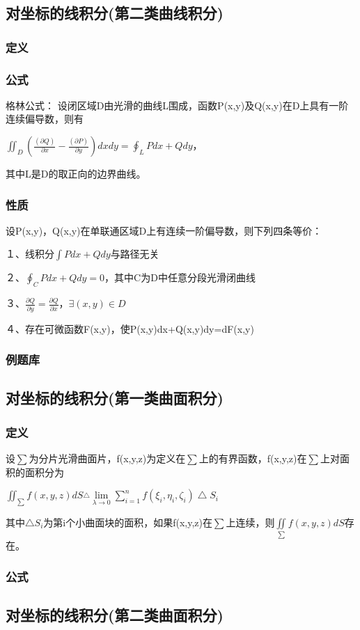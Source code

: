 \documentclass{ctexart}
\begin{document}
\subsection{对坐标的线积分(第二类曲线积分)}
\subsubsection{定义} 
\subsubsection{公式}

格林公式：
设闭区域D由光滑的曲线L围成，函数P(x,y)及Q(x,y)在D上具有一阶连续偏导数，则有
\begin{center}
$\iint_{D} (\frac{(\partial Q)}{\partial x}-\frac{(\partial P)}{\partial y})dxdy=\oint_L Pdx+Qdy$，
\end{center}
其中L是D的取正向的边界曲线。
\subsubsection{性质}

设P(x,y)，Q(x,y)在单联通区域D上有连续一阶偏导数，则下列四条等价：

１、线积分$\int　Pdx+Qdy$与路径无关

２、$\oint_C Pdx+Qdy=0$，其中C为D中任意分段光滑闭曲线

３、$\frac{\partial Q}{\partial y}=\frac{\partial Q}{\partial x}$，$\exists (x,y) \in D$

４、存在可微函数F(x,y)，使P(x,y)dx+Q(x,y)dy=dF(x,y)

\subsubsection{例题库}

\subsection{对坐标的线积分(第一类曲面积分)}
\subsubsection{定义}
设$\sum$为分片光滑曲面片，f(x,y,z)为定义在$\sum$上的有界函数，f(x,y,z)在$\sum$上对面积的面积分为
\begin{center}
 $\iint_{\sum} f(x,y,z)dS\stackrel{\bigtriangleup}{} \lim\limits_{\lambda \rightarrow 0} \sum\limits_{i=1}^{n} f(\xi_i ,\eta_i ,\zeta _i)\bigtriangleup S_i$
\end{center}
其中$\bigtriangleup S_i$为第i个小曲面块的面积，如果f(x,y,z)在$\sum$上连续，则$\iint\limits_{\sum}f(x,y,z)dS$存在。
\subsubsection{公式}


\subsection{对坐标的线积分(第二类曲面积分)}
\end{document}
